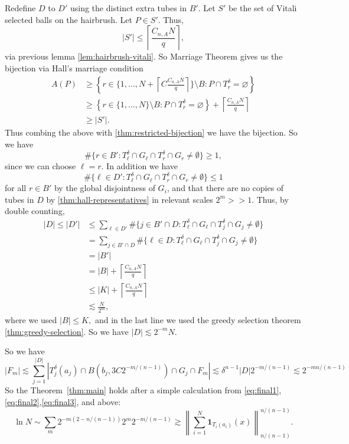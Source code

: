 \documentclass[11pt, letterpaper]{nyjm}
\begin{document}
Redefine $D$ to $D'$ using the distinct extra tubes in $B'$. 
Let $S'$ be the set of Vitali selected balls on the hairbrush. Let $P \in S'.$
Thus,
\[
|S'| \leq \left\lceil \frac{C_{n,A}N}{q} \right \rceil,
\]
via previous lemma \ref{lem:hairbrush-vitali}.
So Marriage Theorem gives us the bijection via Hall's marriage condition 
\[
\begin{aligned}
	A(P) &\geq 	\left\{
	r\in\{1,\ldots,N + \left \lceil C\frac{C_{n,A}N}{q} \right \rceil\}\setminus B:
	P\cap T_r^\delta=\varnothing
	\right\} \\ 
	&\geq \left\{
	r\in\{1,\ldots,N\}\setminus B:
	P\cap T_r^\delta=\varnothing
	\right\}  + \left \lceil \frac{C_{n,A}N}{q} \right \rceil\\
	&\geq |S'|.
\end{aligned}
\]
Thus combing the above with \ref{thm:restricted-bijection} we have the bijection.
So we have
\[
\#\{r\in B' :T_{\ell}^{\delta} \cap  G_{\ell} \cap T_r^{\delta} \cap G_{r} \neq \emptyset\} \geq 1, 
\]
since we can choose $\ell = r.$
In addition we have 
\[
\#\{\ell \in D':T_{\ell}^{\delta} \cap G_{\ell} \cap T_{r}^{\delta} \cap G_{r}\neq \emptyset\} \leq 1
\] for all $r \in B'$ by the global disjointness of $G_{i}$, and that there are no copies of tubes in $D$ by \ref{thm:hall-representatives} in relevant scales $2^m >> 1.$  
Thus, by double counting,
\[
\begin{aligned}
	|D| \leq |D'|
	&\leq \sum_{\ell\in D'}
	\#\{j\in B' \cap D :T_{\ell}^{\delta} \cap G_{\ell} \cap T_j^{\delta} \cap G_{j} \neq \emptyset\} \\
	&=
	\sum_{j \in B' \cap D}
	\#\{\ell \in D:T_{\ell}^{\delta} \cap G_{\ell} \cap T_{j}^{\delta} \cap G_j \neq \emptyset\} \\
	&= |B'| \\
	&= |B| + \left\lceil \frac{C_{n,A}N}{q} \right \rceil \\
	&\leq |K| + \left \lceil \frac{C_{n,A}N}{q} \right\rceil\\
	&\lesssim \frac{N}{2^m},
\end{aligned}
\]
where we used $|B| \leq K,$ and 
in the last line we used the greedy selection theorem \ref{thm:greedy-selection}. 
So we have $|D| \lesssim 2^{-m}N.$

So we have 
\begin{equation}
	|F_m| \lesssim \sum_ {j=1}^{|D|}|T^\delta_j(a_j) \cap B(b_{j},3C2^{-m/(n-1)}) \cap G_j \cap F_m| \lesssim \delta^{n-1}|D|2^{-m/(n-1)} \lesssim 2^{-mn/(n-1)} 
\end{equation}
So the Theorem~\ref{thm:main} holds after a simple calculation from \eqref{eq:final1}, \eqref{eq:final2},\eqref{eq:final3}, and above:
\[
\ln N \sim \sum_m 2^{-m(2-n/(n-1))} 2^{m}2^{-m/(n-1)}
\gtrsim \left\| \sum_{i=1}^{N} \mathbf{1}_{T_i(a_i)}(x)
\right\|_{n/(n-1)}^{n/(n-1)}.
\] 
\end{document}
